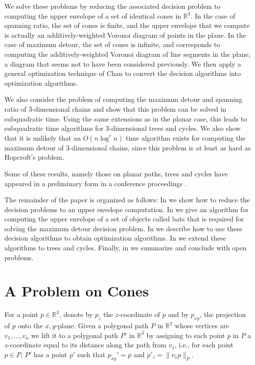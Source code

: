 \documentclass[lotsofwhite]{patmorin}
\begin{document}
We solve these problems by reducing the associated decision problem to
computing the upper envelope of a set of identical cones in
$\mathbb{R}^3$.  In the case of spanning ratio, the set of cones is
finite, and the upper envelope that we compute is actually an
additively-weighted Voronoi diagram of points in the plane.  In the
case of maximum detour, the set of cones is infinite, and corresponds
to computing the additively-weighted Voronoi diagram of line segments
in the plane, a diagram that seems not to have been considered
previously.  We then apply a general optimization technique of Chan
\cite{c99} to convert the decision algorithms into optimization
algorithms.

We also consider the problem of computing the maximum detour and
spanning ratio of 3-dimensional chains and show that this problem can
be solved in subquadratic time.  Using the same extensions as in the
planar case, this leads to subquadratic time algorithms for
3-dimensional trees and cycles.  We also show that it is unlikely that
an $O(n\log^c n)$ time algorithm exists for computing the maximum
detour of 3-dimensional chains, since this problem is at least as hard
as Hopcroft's problem.

Some of these results, namely those on planar paths, trees and cycles
have appeared in a preliminary form in a conference proceedings
\cite{lms02}.

The remainder of the paper is organized as follows: In 
we show how to reduce the decision problems to an upper envelope
computation.  In  we give an algorithm for computing the
upper envelope of a set of objects called bats that is required for
solving the maximum detour decision problem.  In  we
describe how to use these decision algorithms to obtain optimization
algorithms.  In  we extend these algorithms to
trees and cycles.  Finally, in  we
summarize and conclude with open problems.


\section{A Problem on Cones}

For a point $p\in\mathbb{R}^3$, denote by $p_z$ the $z$-coordinate of
$p$ and by $p_{xy}$, the projection of $p$ onto the $x,y$-plane.
Given a polygonal path $P$ in $\mathbb{R}^2$ whose vertices are
$v_1,\ldots,v_n$ we lift it to a polygonal path $P'$ in $\mathbb{R}^3$
by assigning to each point $p$ in $P$ a $z$-coordinate equal to its
distance along the path from $v_1$, i.e., for each point $p\in P$,
$P'$ has a point $p'$ such that $p_{xy}'=p$ and $p'_z=\|v_1p\|_P$.
\end{document}
